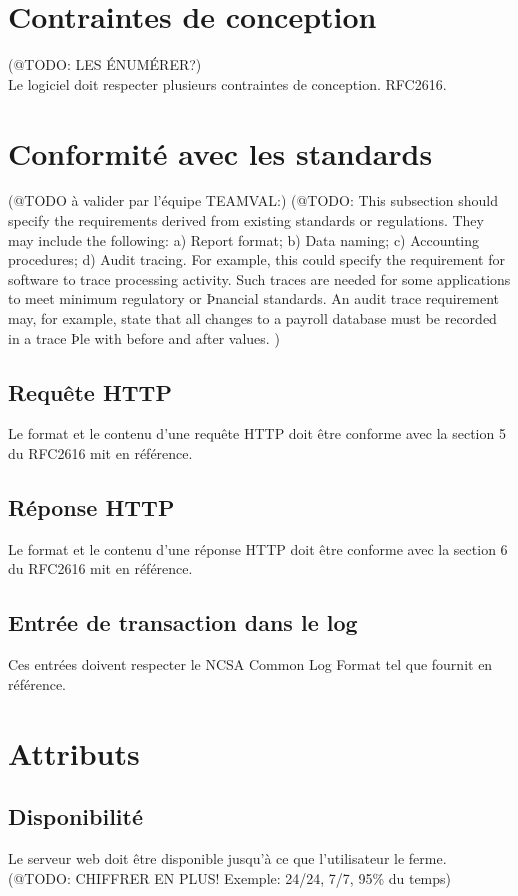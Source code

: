 \documentclass{scrreprt}
\begin{document}
\section{Contraintes de conception}(@TODO: LES ÉNUMÉRER?)\\ Le logiciel doit respecter plusieurs contraintes de conception. RFC2616.
\section{Conformité avec les standards}
(@TODO à valider par l'équipe TEAMVAL:)
(@TODO: This subsection should specify the requirements derived from existing standards or regulations. They may
include the following:
   a)    Report format;
   b)    Data naming;
   c)    Accounting procedures;
   d)    Audit tracing.
For example, this could specify the requirement for software to trace processing activity. Such traces are
needed for some applications to meet minimum regulatory or Þnancial standards. An audit trace requirement
may, for example, state that all changes to a payroll database must be recorded in a trace Þle with before and
after values.
)
\subsection{Requête HTTP}
Le format et le contenu d'une requête HTTP doit être conforme avec la section 5 du RFC2616\cite{http1.0} mit en référence.
\subsection{Réponse HTTP}
Le format et le contenu d'une réponse HTTP doit être conforme avec la section 6 du RFC2616\cite{http1.0} mit en référence.
\subsection{Entrée de transaction dans le log}
Ces entrées doivent respecter le NCSA Common Log Format\cite{NCSA} tel que fournit en référence.



\section{Attributs}
\subsection{Disponibilité}
Le serveur web doit être disponible jusqu'à ce que l'utilisateur le ferme. \\
(@TODO: CHIFFRER EN PLUS! Exemple: 24/24, 7/7, 95\% du temps)
\end{document}
